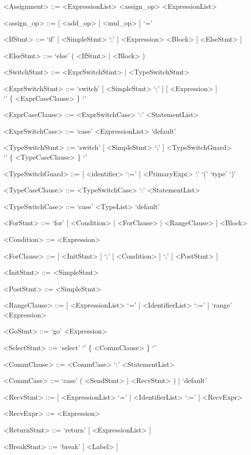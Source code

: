 \documentclass[letterpaper,11pt]{article}
\begin{document}
\begin{appendices}
\begin{grammar}
<Assignment> ::= <ExpressionList> <assign_op> <ExpressionList>


<assign_op> ::= [ <add_op> | <mul_op> ] `='


<IfStmt> ::= `if' [ <SimpleStmt> `;' ] <Expression> <Block> [ <ElseStmt> ]

<ElseStmt> ::= `else' ( <IfStmt> | <Block> )


<SwitchStmt> ::= <ExprSwitchStmt> | <TypeSwitchStmt>


<ExprSwitchStmt> ::= `switch' [ <SimpleStmt> `;' ] [ <Expression> ] \\
`{' \{ <ExprCaseClause> \} `}'

<ExprCaseClause> ::= <ExprSwitchCase> `:' <StatementList>

<ExprSwitchCase> ::= `case' <ExpressionList>
\alt `default'


<TypeSwitchStmt>  ::= `switch' [ <SimpleStmt> `;' ] <TypeSwitchGuard> \\
`{' \{ <TypeCaseClause> \} `}'

<TypeSwitchGuard> ::= [ <identifier> `:=' ] <PrimaryExpr> `.' `(' `type' `)'

<TypeCaseClause>  ::= <TypeSwitchCase> `:' <StatementList>

<TypeSwitchCase>  ::= `case' <TypeList>
\alt `default'


<ForStmt> ::= `for' [ <Condition> | <ForClause> | <RangeClause> ] <Block>

<Condition> ::= <Expression>


<ForClause> ::= [ <InitStmt> ] `;' [ <Condition> ] `;' [ <PostStmt> ]

<InitStmt> ::= <SimpleStmt>

<PostStmt> ::= <SimpleStmt>


<RangeClause> ::= [ <ExpressionList> `=' | <IdentifierList> `:=' ] `range' <Expression>


<GoStmt> ::= `go' <Expression>


<SelectStmt> ::= `select' `{' \{ <CommClause> \} `}'

<CommClause> ::= <CommCase> `:' <StatementList>

<CommCase>   ::= `case' ( <SendStmt> | <RecvStmt> ) | `default'

<RecvStmt>   ::= [ <ExpressionList> `=' | <IdentifierList> `:=' ] <RecvExpr>

<RecvExpr>   ::= <Expression>


<ReturnStmt> ::= `return' [ <ExpressionList> ]


<BreakStmt> ::= `break' [ <Label> ]



\end{grammar}
\end{appendices}
\end{document}
